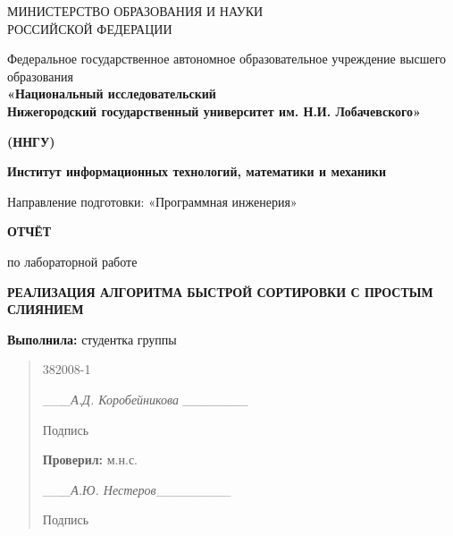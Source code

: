 \documentclass[]{article}
\date{}
\begin{document}
\protect\hypertarget{_Toc27872035}{}{\protect\hypertarget{_Toc27835135}{}{\protect\hypertarget{_Toc27873356}{}{\protect\hypertarget{_Toc27873255}{}{\protect\hypertarget{_Toc27834939}{}{}}}}}МИНИСТЕРСТВО
ОБРАЗОВАНИЯ И НАУКИ\\
РОССИЙСКОЙ ФЕДЕРАЦИИ

Федеральное государственное автономное образовательное учреждение
высшего образования\\
\textbf{«Национальный исследовательский\\
Нижегородский государственный университет им. Н.И. Лобачевского»}

\textbf{(ННГУ)}

\protect\hypertarget{_Toc27872036}{}{\protect\hypertarget{_Toc27834940}{}{\protect\hypertarget{_Toc27873256}{}{\protect\hypertarget{_Toc27873357}{}{\protect\hypertarget{_Toc27835136}{}{}}}}}\textbf{Институт
информационных технологий, математики и механики}

\protect\hypertarget{_Toc27835138}{}{\protect\hypertarget{_Toc27873258}{}{\protect\hypertarget{_Toc27834942}{}{\protect\hypertarget{_Toc27873359}{}{\protect\hypertarget{_Toc27872038}{}{}}}}}Направление
подготовки: «Программная инженерия»

\protect\hypertarget{_Toc27834943}{}{\protect\hypertarget{_Toc27872039}{}{\protect\hypertarget{_Toc27835139}{}{\protect\hypertarget{_Toc27873360}{}{\protect\hypertarget{_Toc27873259}{}{}}}}}

\textbf{ОТЧЁТ}

по лабораторной работе

\textbf{РЕАЛИЗАЦИЯ АЛГОРИТМА БЫСТРОЙ СОРТИРОВКИ С ПРОСТЫМ СЛИЯНИЕМ}

\begin{quote}
\protect\hypertarget{_Toc27872040}{}{\protect\hypertarget{_Toc27873361}{}{\protect\hypertarget{_Toc27873260}{}{\protect\hypertarget{_Toc27834944}{}{\protect\hypertarget{_Toc27835140}{}{}}}}}
\end{quote}

\textbf{Выполнила:} студентка группы

\begin{quote}
382008-1

\_\_\emph{\_А.Д. Коробейникова \_\_\_\_\_\_\_}

Подпись

\protect\hypertarget{_Toc27872041}{}{\protect\hypertarget{_Toc27873261}{}{\protect\hypertarget{_Toc27835141}{}{\protect\hypertarget{_Toc27873362}{}{\protect\hypertarget{_Toc27834945}{}{}}}}}\textbf{Проверил:}
м.н.с.

\_\_\emph{\_А.Ю. Нестеров}\_\_\_\_\_\_\_\_

Подпись
\end{quote}
\end{document}
